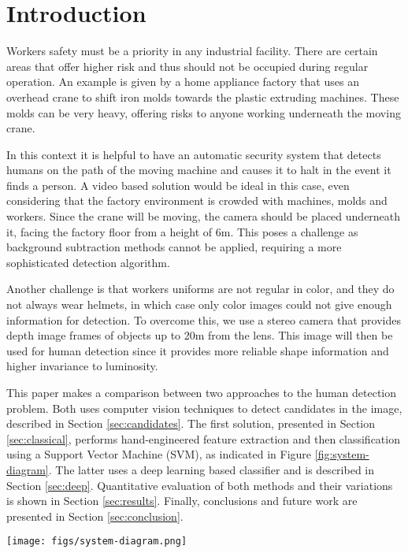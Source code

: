 \section{Introduction}
  Workers safety must be a priority in any industrial facility. There are certain areas that offer higher risk and thus should not be occupied during regular operation. An example is given by a home appliance factory that uses an overhead crane to shift iron molds towards the plastic extruding machines. These molds can be very heavy, offering risks to anyone working underneath the moving crane.

  In this context it is helpful to have an automatic security system that detects humans on the path of the moving machine and causes it to halt in the event it finds a person. A video based solution would be ideal in this case, even considering that the factory environment is crowded with machines, molds and workers. Since the crane will be moving, the camera should be placed underneath it,  facing the factory floor from a height of 6m. This poses a challenge as background subtraction methods cannot be applied, requiring a more sophisticated detection algorithm.

  Another challenge is that workers uniforms are not regular in color, and they do not always wear helmets, in which case only color images could not give enough information for detection. To overcome this, we use a stereo camera that provides depth image frames of objects up to 20m from the lens. This image will then be used for human detection since it provides more reliable shape information and higher invariance to luminosity.

  This paper makes a comparison between two approaches to the human detection problem. Both uses computer vision techniques to detect candidates in the image, described in Section \ref{sec:candidates}. The first solution, presented in Section \ref{sec:classical}, performs hand-engineered feature extraction and then classification using a Support Vector Machine (SVM), as indicated in Figure \ref{fig:system-diagram}. The latter uses a deep learning based classifier and is described in Section \ref{sec:deep}. Quantitative evaluation of both methods and their variations is shown in Section \ref{sec:results}. Finally, conclusions and future work are presented in Section \ref{sec:conclusion}.

  \begin{figure*}[!t]
  \centering
  \texttt{[image: figs/system-diagram.png]}
  \caption{System diagram, traditional CV approach}
  \label{fig:system-diagram}
  \end{figure*}

